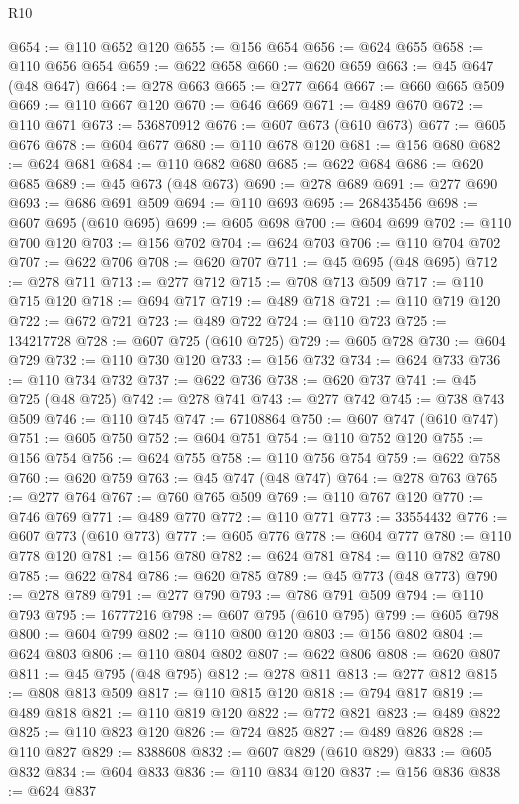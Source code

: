 \begin{lexlean}{R10}
\begin{coremodule}
{{{{{{{{{{{{{{{{{{{{{{{{{{{{{{{{{{{{{{{{{{{{{{{{{{{{{{{{{{{{{{{{{{{{{{{{{{{{{{{{{{{{@654 := @110 @652 @120
@655 := @156 @654
@656 := @624 @655
@658 := @110 @656 @654
@659 := @622 @658
@660 := @620 @659
@663 := @45 @647 (@48 @647)
@664 := @278 @663
@665 := @277 @664
@667 := @660 @665 @509
@669 := @110 @667 @120
@670 := @646 @669
@671 := @489 @670
@672 := @110 @671
@673 := 536870912
@676 := @607 @673 (@610 @673)
@677 := @605 @676
@678 := @604 @677
@680 := @110 @678 @120
@681 := @156 @680
@682 := @624 @681
@684 := @110 @682 @680
@685 := @622 @684
@686 := @620 @685
@689 := @45 @673 (@48 @673)
@690 := @278 @689
@691 := @277 @690
@693 := @686 @691 @509
@694 := @110 @693
@695 := 268435456
@698 := @607 @695 (@610 @695)
@699 := @605 @698
@700 := @604 @699
@702 := @110 @700 @120
@703 := @156 @702
@704 := @624 @703
@706 := @110 @704 @702
@707 := @622 @706
@708 := @620 @707
@711 := @45 @695 (@48 @695)
@712 := @278 @711
@713 := @277 @712
@715 := @708 @713 @509
@717 := @110 @715 @120
@718 := @694 @717
@719 := @489 @718
@721 := @110 @719 @120
@722 := @672 @721
@723 := @489 @722
@724 := @110 @723
@725 := 134217728
@728 := @607 @725 (@610 @725)
@729 := @605 @728
@730 := @604 @729
@732 := @110 @730 @120
@733 := @156 @732
@734 := @624 @733
@736 := @110 @734 @732
@737 := @622 @736
@738 := @620 @737
@741 := @45 @725 (@48 @725)
@742 := @278 @741
@743 := @277 @742
@745 := @738 @743 @509
@746 := @110 @745
@747 := 67108864
@750 := @607 @747 (@610 @747)
@751 := @605 @750
@752 := @604 @751
@754 := @110 @752 @120
@755 := @156 @754
@756 := @624 @755
@758 := @110 @756 @754
@759 := @622 @758
@760 := @620 @759
@763 := @45 @747 (@48 @747)
@764 := @278 @763
@765 := @277 @764
@767 := @760 @765 @509
@769 := @110 @767 @120
@770 := @746 @769
@771 := @489 @770
@772 := @110 @771
@773 := 33554432
@776 := @607 @773 (@610 @773)
@777 := @605 @776
@778 := @604 @777
@780 := @110 @778 @120
@781 := @156 @780
@782 := @624 @781
@784 := @110 @782 @780
@785 := @622 @784
@786 := @620 @785
@789 := @45 @773 (@48 @773)
@790 := @278 @789
@791 := @277 @790
@793 := @786 @791 @509
@794 := @110 @793
@795 := 16777216
@798 := @607 @795 (@610 @795)
@799 := @605 @798
@800 := @604 @799
@802 := @110 @800 @120
@803 := @156 @802
@804 := @624 @803
@806 := @110 @804 @802
@807 := @622 @806
@808 := @620 @807
@811 := @45 @795 (@48 @795)
@812 := @278 @811
@813 := @277 @812
@815 := @808 @813 @509
@817 := @110 @815 @120
@818 := @794 @817
@819 := @489 @818
@821 := @110 @819 @120
@822 := @772 @821
@823 := @489 @822
@825 := @110 @823 @120
@826 := @724 @825
@827 := @489 @826
@828 := @110 @827
@829 := 8388608
@832 := @607 @829 (@610 @829)
@833 := @605 @832
@834 := @604 @833
@836 := @110 @834 @120
@837 := @156 @836
@838 := @624 @837
}}}}}}}}}}}}}}}}}}}}}}}}}}}}}}}}}}}}}}}}}}}}}}}}}}}}}}}}}}}}}}}}}}}}}}}}}}}}}}}}}}}}
\end{coremodule}
\end{lexlean}
